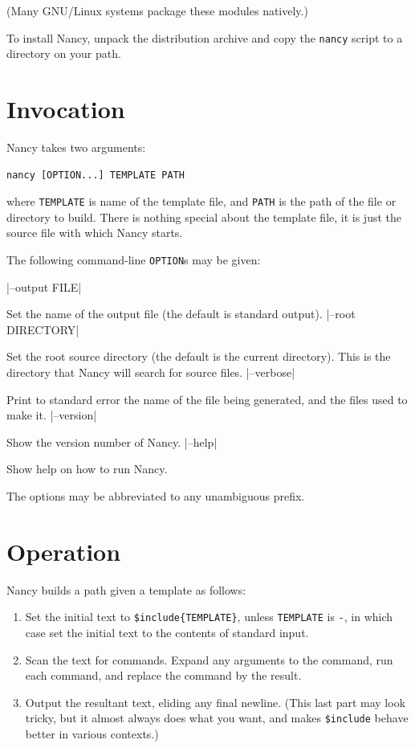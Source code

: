 \documentclass[a4paper,english]{scrartcl}
\begin{document}
(Many GNU/Linux systems package these modules natively.)

To install Nancy, unpack the distribution archive and copy the \verb|nancy| script to a directory on your path.

\section{Invocation}

Nancy takes two arguments:

\begin{verbatim}
nancy [OPTION...] TEMPLATE PATH
\end{verbatim}

\noindent where \verb|TEMPLATE| is name of the template file, and \verb|PATH| is the path of the file or directory to build. There is nothing special about the template file, it is just the source file with which Nancy starts.

The following command-line \verb|OPTION|s may be given:

\begin{description}
|--output FILE|
\item[\UseVerb{output}]Set the name of the output file (the default is standard output).
|--root DIRECTORY|
\item[\UseVerb{root}]Set the root source directory (the default is the current directory). This is the directory that Nancy will search for source files.
|--verbose|
\item[\UseVerb{verbose}]Print to standard error the name of the file being generated, and the files used to make it.
|--version|
\item[\UseVerb{version}]Show the version number of Nancy.
|--help|
\item[\UseVerb{help}]Show help on how to run Nancy.
\end{description}

The options may be abbreviated to any unambiguous prefix.

\section{Operation}
\label{operation}

Nancy builds a path given a template as follows:

\begin{enumerate}
\item Set the initial text to \verb|$include{TEMPLATE}|, unless \verb|TEMPLATE| is \verb|-|, in which case set the initial text to the contents of standard input.
\item Scan the text for commands. Expand any arguments to the command, run each command, and replace the command by the result.
\item Output the resultant text, eliding any final newline. (This last part may look tricky, but it almost always does what you want, and makes \verb|$include| behave better in various contexts.)
\end{enumerate}
\end{document}
